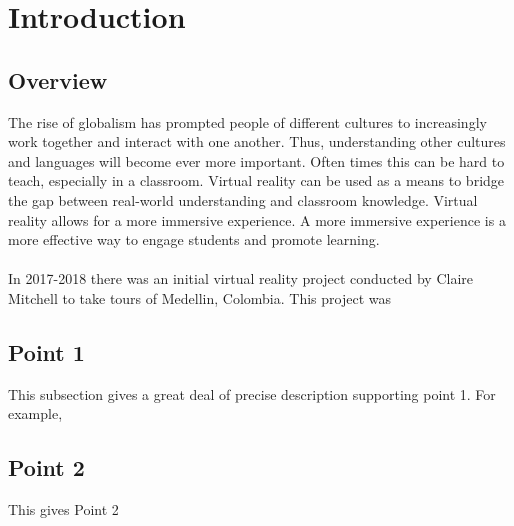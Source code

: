 \section{Introduction}
\label{sec:Introduction}

\subsection{Overview} 
The rise of globalism has prompted people of different cultures to increasingly work together and interact with one another. Thus, understanding other cultures and languages will become ever more important. Often times this can be hard to teach, especially in a classroom. Virtual reality can be used as a means to bridge the gap between real-world understanding and classroom knowledge. Virtual reality allows for a more immersive experience. A more immersive experience is a more effective way to engage students and promote learning. \\
\\
In 2017-2018 there was an initial virtual reality project conducted by Claire Mitchell to take tours of Medellin, Colombia. This project was
\subsection{Point 1}
This subsection gives a great deal of precise description supporting point 1.  For example,

\subsection{Point 2}
This gives Point 2
